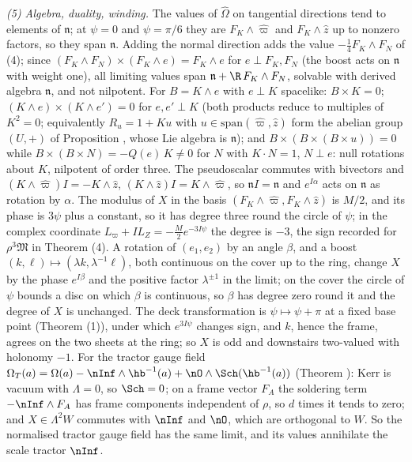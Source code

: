 \emph{(5) Algebra, duality, winding.} The values of $\widehat\Omega$ on tangential directions tend to elements of $\mathfrak n$; at $\psi = 0$ and $\psi = \pi/6$ they are $F_K \wedge \hat\varpi$ and $F_K \wedge \hat z$ up to nonzero factors, so they span $\mathfrak n$. Adding the normal direction adds the value $-\tfrac14 F_K \wedge F_N$ of (4); since $(F_K \wedge F_N) \times (F_K \wedge e) = F_K \wedge e$ for $e \perp F_K, F_N$ (the boost acts on $\mathfrak n$ with weight one), all limiting values span $\mathfrak n + \R\,F_K \wedge F_N$, solvable with derived algebra $\mathfrak n$, and not nilpotent. For $B = K \wedge e$ with $e \perp K$ spacelike: $B \times K = 0$; $(K \wedge e) \times (K \wedge e') = 0$ for $e, e' \perp K$ (both products reduce to multiples of $K^2 = 0$; equivalently $R_u = 1 + Ku$ with $u \in \mathrm{span}(\hat\varpi, \hat z)$ form the abelian group $(U, +)$ of Proposition , whose Lie algebra is $\mathfrak n$); and $B \times (B \times (B \times u)) = 0$ while $B \times (B \times N) = -Q(e)\,K \neq 0$ for $N$ with $K \cdot N = 1$, $N \perp e$: null rotations about $K$, nilpotent of order three. The pseudoscalar commutes with bivectors and $(K \wedge \hat\varpi)I = -K \wedge \hat z$, $(K \wedge \hat z)I = K \wedge \hat\varpi$, so $\mathfrak n I = \mathfrak n$ and $e^{I\alpha}$ acts on $\mathfrak n$ as rotation by $\alpha$. The modulus of $X$ in the basis $(F_K \wedge \hat\varpi, F_K \wedge \hat z)$ is $M/2$, and its phase is $3\psi$ plus a constant, so it has degree three round the circle of $\psi$; in the complex coordinate $L_\varpi + IL_Z = -\tfrac{M}{2}e^{-3I\psi}$ the degree is $-3$, the sign recorded for $\rho^3\mathfrak M$ in Theorem (4). A rotation of $(e_1, e_2)$ by an angle $\beta$, and a boost $(k, \ell) \mapsto (\lambda k, \lambda^{-1}\ell)$, both continuous on the cover up to the ring, change $X$ by the phase $e^{I\beta}$ and the positive factor $\lambda^{\pm1}$ in the limit; on the cover the circle of $\psi$ bounds a disc on which $\beta$ is continuous, so $\beta$ has degree zero round it and the degree of $X$ is unchanged. The deck transformation is $\psi \mapsto \psi + \pi$ at a fixed base point (Theorem (1)), under which $e^{3I\psi}$ changes sign, and $k$, hence the frame, agrees on the two sheets at the ring; so $X$ is odd and downstairs two-valued with holonomy $-1$. For the tractor gauge field $\Omega_T(a) = \Omega(a) - \nInf \wedge \hb^{-1}(a) + \nO \wedge \Sch(\hb^{-1}(a))$ (Theorem ): Kerr is vacuum with $\Lambda = 0$, so $\Sch = 0$; on a frame vector $F_A$ the soldering term $-\nInf \wedge F_A$ has frame components independent of $\rho$, so $d$ times it tends to zero; and $X \in \Lambda^2 W$ commutes with $\nInf$ and $\nO$, which are orthogonal to $W$. So the normalised tractor gauge field has the same limit, and its values annihilate the scale tractor $\nInf$.

